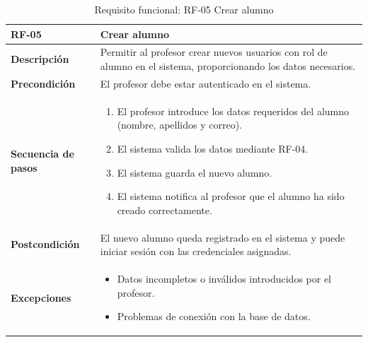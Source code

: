 \begin{table}[H]
\centering
\begin{tabularx}{\textwidth}{
  |>{\centering\arraybackslash}l
  |>{\centering\arraybackslash}X|}
\hline
\textbf{RF-05} & \textbf{Crear alumno} \\ \hline

\textbf{Descripción} & Permitir al profesor crear nuevos usuarios con rol de alumno en el sistema, proporcionando los datos necesarios. \\ \hline

\textbf{Precondición} & El profesor debe estar autenticado en el sistema. \\ \hline

\textbf{Secuencia de pasos} & 
\begin{enumerate}
  \item El profesor introduce los datos requeridos del alumno (nombre, apellidos y correo).
  \item El sistema valida los datos mediante RF-04.
  \item El sistema guarda el nuevo alumno.
  \item El sistema notifica al profesor que el alumno ha sido creado correctamente.
\end{enumerate} \\ \hline

\textbf{Postcondición} & El nuevo alumno queda registrado en el sistema y puede iniciar sesión con las credenciales asignadas. \\ \hline

\textbf{Excepciones} & 
\begin{itemize}
  \item Datos incompletos o inválidos introducidos por el profesor.
  \item Problemas de conexión con la base de datos.
\end{itemize} \\ \hline
\end{tabularx}
\caption{Requisito funcional: RF-05 Crear alumno}
\end{table}
